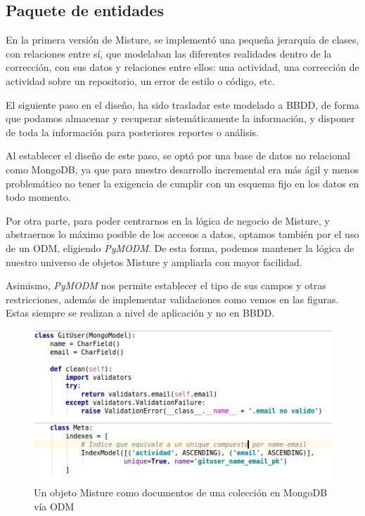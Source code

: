\subsection{Paquete de entidades} 
\label{subsec:paq_entities}

En la primera versión de Misture, se implementó una pequeña jerarquía de clases, con relaciones entre sí, que modelaban las diferentes realidades dentro de la corrección, con sus datos y relaciones entre ellos: una actividad, una corrección de actividad sobre un repositorio, un error de estilo o código, etc.


El siguiente paso en el diseño, ha sido trasladar este modelado a BBDD, de forma que podamos almacenar y recuperar sistemáticamente la información, y disponer de toda la información para posteriores reportes o análisis.


Al establecer el diseño de este paso, se optó por una base de datos no relacional como MongoDB, ya que para nuestro desarrollo incremental era más ágil y menos problemático no tener la exigencia de cumplir con un esquema fijo en los datos en todo momento.


Por otra parte, para poder centrarnos en la lógica de negocio de Misture, y abstraernos lo máximo posible de los accesos a datos, optamos también por el uso de un ODM, eligiendo \textit{PyMODM}. De esta forma, podemos mantener la lógica de nuestro universo de objetos Misture y ampliarla con mayor facilidad.


Asimismo, \textit{PyMODM} nos permite establecer el tipo de sus campos y otras restricciones, además de implementar validaciones como vemos en las figuras. Estas siempre se realizan a nivel de aplicación y no en BBDD.


\begin{figure}[H]
   \centering
   \includegraphics[width=16cm]{img/Selection_026_mongomodel}
   \caption{Un objeto Misture como documentos de una colección en MongoDB vía ODM}
   \label{figura:iter2}
\end{figure}

